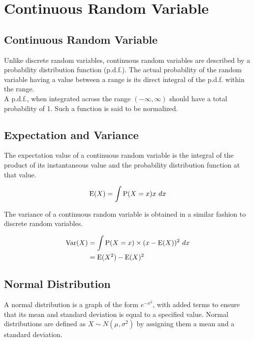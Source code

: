 \documentclass[../main]{subfiles}
\begin{document}
\section{Continuous Random Variable}

	\subsection{Continuous Random Variable}

	Unlike discrete random variables, continuous random variables are described by a probability distribution function (p.d.f.). The actual probability of the random variable having a value between a range is its direct integral of the p.d.f. within the range. \\

	A p.d.f., when integrated across the range \((-\infty,\infty)\) should have a total probability of 1. Such a function is said to be normalized. \\

	\subsection{Expectation and Variance}

	The expectation value of a continuous random variable is the integral of the product of its instantaneous value and the probability distribution function at that value.

 	\[ \operatorname{E}(X) = \int \operatorname{P}(X=x) x ~ dx\]

 	The variance of a continuous random variable is obtained in a similar fashion to discrete random variables.

 	\begin{equation*} \begin{aligned}
		\operatorname{Var}(X) & = \int \operatorname{P}(X=x) \times (x - \operatorname{E}(X))^2 ~ dx \\
				& = \operatorname{E}(X^2) - \operatorname{E}(X)^2
	\end{aligned} \end{equation*}

	\subsection{Normal Distribution}

	A normal distribution is a graph of the form \(e^{-x^2}\), with added terms to ensure that its mean and standard deviation is equal to a specified value. Normal distributions are defined as \(X\sim N(\mu,\sigma^2)\) by assigning them a mean and a standard deviation. \\
\end{document}
